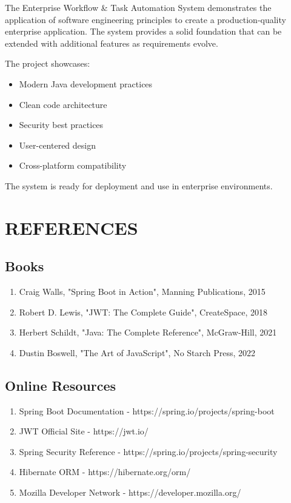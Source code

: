 \documentclass[12pt,a4paper,twoside]{book}
\begin{document}
The Enterprise Workflow \& Task Automation System demonstrates the application of software engineering principles to create a production-quality enterprise application. The system provides a solid foundation that can be extended with additional features as requirements evolve.

The project showcases:
\begin{itemize}
    \item Modern Java development practices
    \item Clean code architecture
    \item Security best practices
    \item User-centered design
    \item Cross-platform compatibility
\end{itemize}

The system is ready for deployment and use in enterprise environments.

\chapter{REFERENCES}

\section{Books}

\begin{enumerate}
    \item Craig Walls, "Spring Boot in Action", Manning Publications, 2015
    \item Robert D. Lewis, "JWT: The Complete Guide", CreateSpace, 2018
    \item Herbert Schildt, "Java: The Complete Reference", McGraw-Hill, 2021
    \item Dustin Boswell, "The Art of JavaScript", No Starch Press, 2022
\end{enumerate}

\section{Online Resources}

\begin{enumerate}
    \item Spring Boot Documentation - https://spring.io/projects/spring-boot
    \item JWT Official Site - https://jwt.io/
    \item Spring Security Reference - https://spring.io/projects/spring-security
    \item Hibernate ORM - https://hibernate.org/orm/
    \item Mozilla Developer Network - https://developer.mozilla.org/
\end{enumerate}
\end{document}
